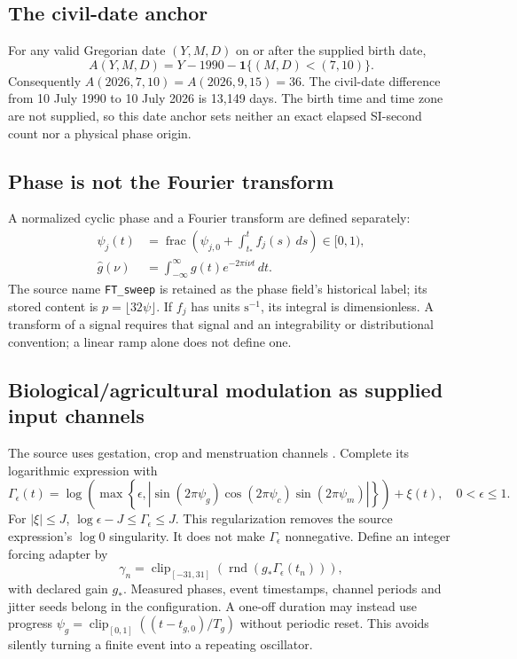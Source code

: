 \documentclass[11pt,a4paper]{article}
\newcommand{\ind}{\mathbf{1}}
\newcommand{\clip}{\operatorname{clip}}
\newcommand{\round}{\operatorname{rnd}}
\newcommand{\fracpart}{\operatorname{frac}}
\newcommand{\sourcepage}[1]{\cite[pp.~#1]{source}}
\numberwithin{equation}{section}
\begin{document}
\subsection{The civil-date anchor}
For any valid Gregorian date $(Y,M,D)$ on or after the supplied birth date,
\begin{equation}
A(Y,M,D)=Y-1990-\ind\{(M,D)<(7,10)\}.
\end{equation}
Consequently $A(2026,7,10)=A(2026,9,15)=36$. The civil-date difference from 10 July 1990 to 10 July 2026 is 13,149 days. The birth time and time zone are not supplied, so this date anchor sets neither an exact elapsed SI-second count nor a physical phase origin.

\subsection{Phase is not the Fourier transform}
A normalized cyclic phase and a Fourier transform are defined separately:
\begin{align}
\psi_j(t)&=\fracpart\!\left(\psi_{j,0}+\int_{t_*}^{t}f_j(s)\,ds\right)\in[0,1),\\
\widehat g(\nu)&=\int_{-\infty}^{\infty}g(t)e^{-2\pi i\nu t}\,dt.
\end{align}
The source name \texttt{FT\_sweep} is retained as the phase field's historical label; its stored content is $p=\lfloor32\psi\rfloor$. If $f_j$ has units $\mathrm{s^{-1}}$, its integral is dimensionless. A transform of a signal requires that signal and an integrability or distributional convention; a linear ramp alone does not define one.

\subsection{Biological/agricultural modulation as supplied input channels}
The source uses gestation, crop and menstruation channels \sourcepage{2--4}. Complete its logarithmic expression with
\begin{equation}
\Gamma_\epsilon(t)=\log\!\left(\max\left\{\epsilon,
\left|\sin(2\pi\psi_g)\cos(2\pi\psi_c)\sin(2\pi\psi_m)\right|\right\}\right)+\xi(t),
\quad 0<\epsilon\le1.
\label{eq:modulation}
\end{equation}
For $|\xi|\le J$, $\log\epsilon-J\le\Gamma_\epsilon\le J$. This regularization removes the source expression's $\log0$ singularity. It does not make $\Gamma_\epsilon$ nonnegative. Define an integer forcing adapter by
\begin{equation}
\gamma_n=\clip_{[-31,31]}\!\left(\round(g_*\Gamma_\epsilon(t_n))\right),
\end{equation}
with declared gain $g_*$. Measured phases, event timestamps, channel periods and jitter seeds belong in the configuration. A one-off duration may instead use progress
$\psi_g=\clip_{[0,1]}((t-t_{g,0})/T_g)$ without periodic reset. This avoids silently turning a finite event into a repeating oscillator.
\end{document}
